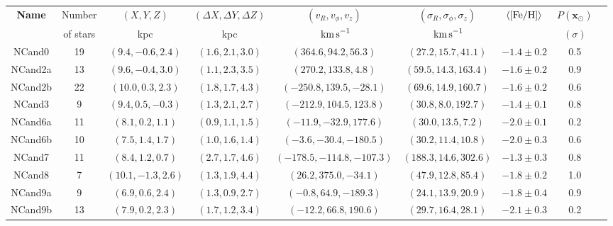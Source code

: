 \begin{table}[t!] 
\begin{tabularx}{0.95\textwidth}{c|cccccccc}
\hline\hline
{\bf Name}      & Number & $(X,Y,Z)$ & $(\Delta X,\Delta Y,\Delta Z)$ & $(v_R,v_\phi,v_z)$ & $(\sigma_R,\sigma_\phi,\sigma_z) $ & \quad $\langle [{\rm Fe}/{\rm H}] \rangle$ \quad        & \quad$P(\mathbf{x}_\odot)$\\
      &  of stars & kpc & kpc \quad\quad& $\textrm{ km \!s}^{-1}$   \quad    & $\textrm{ km \!s}^{-1} $ \quad &    &   $(\sigma)$  & \\
    \hline
NCand0   & 19        & $(9.4,-0.6,2.4)$  & $(1.6,2.1,3.0)$                      & $(364.6,94.2,56.3)$      & $(27.2,15.7,41.1)$                & $-1.4\pm 0.2$ & 0.5 \\
NCand2a  & 13        & $(9.6,-0.4,3.0)$  & $(1.1,2.3,3.5)$                      & $(270.2,133.8,4.8)$      & $(59.5,14.3,163.4)$               & $-1.6\pm 0.2$ & 0.9 \\
NCand2b  & 22        & $(10.0,0.3,2.3)$  & $(1.8,1.7,4.3)$                      & $(-250.8,139.5,-28.1)$   & $(69.6,14.9,160.7)$               & $-1.6\pm 0.2$ & 0.6 \\
NCand3   & 9         & $(9.4,0.5,-0.3)$  & $(1.3,2.1,2.7)$                      & $(-212.9,104.5,123.8)$   & $(30.8,8.0,192.7)$                & $-1.4\pm 0.1$ & 0.8 \\
NCand6a  & 11        & $(8.1,0.2,1.1)$   & $(0.9,1.1,1.5)$                      & $(-11.9,-32.9,177.6)$    & $(30.0,13.5,7.2)$                 & $-2.0\pm 0.1$ & 0.2 \\
NCand6b  & 10        & $(7.5,1.4,1.7)$   & $(1.0,1.6,1.4)$                      & $(-3.6,-30.4,-180.5)$    & $(30.2,11.4,10.8)$                & $-2.0\pm 0.3$ & 0.6 \\
NCand7   & 11        & $(8.4,1.2,0.7)$   & $(2.7,1.7,4.6)$                      & $(-178.5,-114.8,-107.3)$ & $(188.3,14.6,302.6)$              & $-1.3\pm 0.3$ & 0.8 \\
NCand8   & 7         & $(10.1,-1.3,2.6)$ & $(1.3,1.9,4.4)$                      & $(26.2,375.0,-34.1)$     & $(47.9,12.8,85.4)$                & $-1.8\pm 0.2$ & 1.0 \\
NCand9a  & 9         & $(6.9,0.6,2.4)$   & $(1.3,0.9,2.7)$                      & $(-0.8,64.9,-189.3)$     & $(24.1,13.9,20.9)$                & $-1.8\pm 0.4$ & 0.9 \\
NCand9b  & 13        & $(7.9,0.2,2.3)$   & $(1.7,1.2,3.4)$                      & $(-12.2,66.8,190.6)$     & $(29.7,16.4,28.1)$                & $-2.1\pm 0.3$ & 0.2 \\

\end{tabularx}
\end{table}
